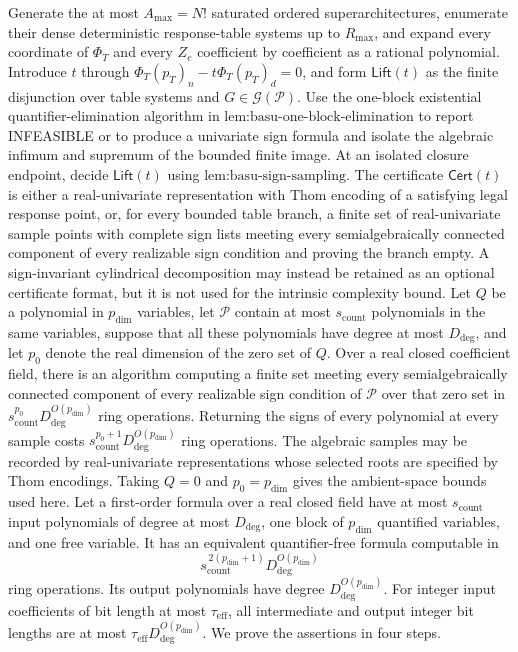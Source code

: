 Generate the at most \(A_{\max}=N!\) saturated ordered superarchitectures, enumerate their dense deterministic response-table systems up to \(R_{\max}\), and expand every coordinate of \(\Phi_T\) and every \(Z_e\) coefficient by coefficient as a rational polynomial.  Introduce \(t\) through \(\Phi_T(p_T)_n-t\Phi_T(p_T)_d=0\), and form \(\mathsf{Lift}(t)\) as the finite disjunction over table systems and \(G\in\mathcal G(\mathcal P)\).  Use the one-block existential quantifier-elimination algorithm in \(\text{lem:basu-one-block-elimination}\) to report INFEASIBLE or to produce a univariate sign formula and isolate the algebraic infimum and supremum of the bounded finite image.  At an isolated closure endpoint, decide \(\mathsf{Lift}(t)\) using \(\text{lem:basu-sign-sampling}\).  The certificate \(\mathsf{Cert}(t)\) is either a real-univariate representation with Thom encoding of a satisfying legal response point, or, for every bounded table branch, a finite set of real-univariate sample points with complete sign lists meeting every semialgebraically connected component of every realizable sign condition and proving the branch empty.  A sign-invariant cylindrical decomposition may instead be retained as an optional certificate format, but it is not used for the intrinsic complexity bound.
Let \(Q\) be a polynomial in \(p_{\mathrm{dim}}\) variables, let \(\mathscr P\) contain at most \(s_{\mathrm{count}}\) polynomials in the same variables, suppose that all these polynomials have degree at most \(D_{\mathrm{deg}}\), and let \(p_0\) denote the real dimension of the zero set of \(Q\).  Over a real closed coefficient field, there is an algorithm computing a finite set meeting every semialgebraically connected component of every realizable sign condition of \(\mathscr P\) over that zero set in \(s_{\mathrm{count}}^{p_0}D_{\mathrm{deg}}^{O(p_{\mathrm{dim}})}\) ring operations.  Returning the signs of every polynomial at every sample costs \(s_{\mathrm{count}}^{p_0+1}D_{\mathrm{deg}}^{O(p_{\mathrm{dim}})}\) ring operations.  The algebraic samples may be recorded by real-univariate representations whose selected roots are specified by Thom encodings.  Taking \(Q=0\) and \(p_0=p_{\mathrm{dim}}\) gives the ambient-space bounds used here.
Let a first-order formula over a real closed field have at most \(s_{\mathrm{count}}\) input polynomials of degree at most \(D_{\mathrm{deg}}\), one block of \(p_{\mathrm{dim}}\) quantified variables, and one free variable.  It has an equivalent quantifier-free formula computable in
\[
s_{\mathrm{count}}^{\,2(p_{\mathrm{dim}}+1)}D_{\mathrm{deg}}^{O(p_{\mathrm{dim}})}
\]
ring operations.  Its output polynomials have degree \(D_{\mathrm{deg}}^{O(p_{\mathrm{dim}})}\).  For integer input coefficients of bit length at most \(\tau_{\mathrm{eff}}\), all intermediate and output integer bit lengths are at most \(\tau_{\mathrm{eff}}D_{\mathrm{deg}}^{O(p_{\mathrm{dim}})}\).
We prove the assertions in four steps.

